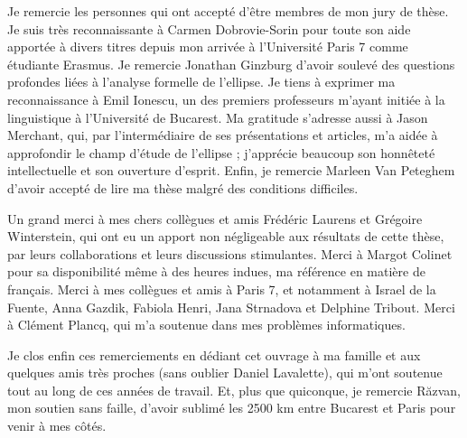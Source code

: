 Je remercie les personnes qui ont accepté d’être membres de mon jury de thèse. Je suis très reconnaissante à Carmen Dobrovie-Sorin pour toute son aide apportée à divers titres depuis mon arrivée à l’Université Paris 7 comme étudiante Erasmus. Je remercie Jonathan Ginzburg d’avoir soulevé des questions profondes liées à l’analyse formelle de l’ellipse. Je tiens à exprimer ma reconnaissance à Emil Ionescu, un des premiers professeurs m’ayant initiée à la linguistique à l’Université de Bucarest. Ma gratitude s’adresse aussi à Jason Merchant, qui, par l’intermédiaire de ses présentations et articles, m’a aidée à approfondir le champ d’étude de l’ellipse ; j’apprécie beaucoup son honnêteté intellectuelle et son ouverture d’esprit. Enfin, je remercie Marleen Van Peteghem d’avoir accepté de lire ma thèse malgré des conditions difficiles. 

Un grand merci à mes chers collègues et amis Frédéric Laurens et Grégoire Winterstein, qui ont eu un apport non négligeable aux résultats de cette thèse, par leurs collaborations et leurs discussions stimulantes. Merci à Margot Colinet pour sa disponibilité même à des heures indues, ma référence en matière de français. Merci à mes collègues et amis à Paris 7, et notamment à Israel de la Fuente, Anna Gazdik, Fabiola Henri, Jana Strnadova et Delphine Tribout. Merci à Clément Plancq, qui m’a soutenue dans mes problèmes informatiques.

Je clos enfin ces remerciements en dédiant cet ouvrage à ma famille et aux quelques amis très proches (sans oublier Daniel Lavalette), qui m’ont soutenue tout au long de ces années de travail. Et, plus que quiconque, je remercie Răzvan, mon soutien sans faille, d’avoir sublimé les 2500 km entre Bucarest et Paris pour venir à mes côtés.